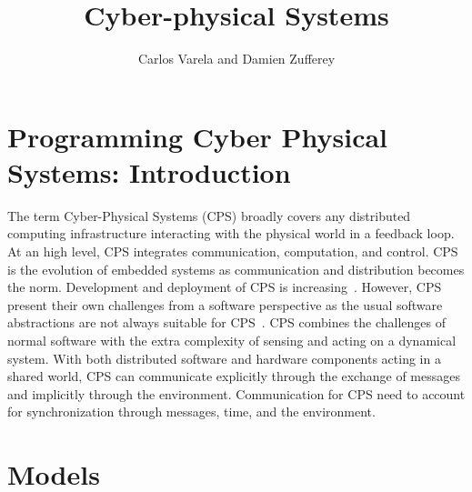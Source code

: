\documentclass[
graybox,
envcountchap
]{svmult}
\begin{document}
\begin{bibunit}
	
\title*{Cyber-physical Systems}
\author{Carlos Varela and Damien Zufferey}
	
\maketitle
	
	
\section{Programming Cyber Physical Systems: Introduction}\label{sec:1} %

The term Cyber-Physical Systems (CPS) broadly covers any distributed computing infrastructure interacting with the physical world in a feedback loop.
At an high level, CPS integrates communication, computation, and control.
CPS is the evolution of embedded systems as communication and distribution becomes the norm.
Development and deployment of CPS is increasing~\cite{DBLP:journals/cacm/KumarK15}.
However, CPS present their own challenges from a software perspective as the usual software abstractions are not always suitable for CPS~\cite{Lee:EECS-2008-8}.
CPS combines the challenges of normal software with the extra complexity of sensing and acting on a dynamical system.
With both distributed software and hardware components acting in a shared world, CPS can communicate explicitly through the exchange of messages and implicitly through the environment.
Communication for CPS need to account for synchronization through messages, time, and the environment.




\section{Models} %


\end{bibunit}
\end{document}
